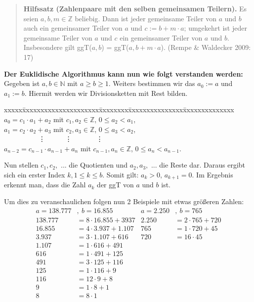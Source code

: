 \documentclass[german,12pt,a4paper]{article}
\begin{document}
\begin{quote}
\small
\textbf{Hilfssatz (Zahlenpaare mit den selben gemeinsamen Teilern).} Es seien $a, b, m \in \mathbb{Z}$ beliebig. Dann ist jeder gemeinsame Teiler von $a$ und $b$ auch ein gemeinsamer Teiler von $a$ und $c := b + m \cdot a$; umgekehrt ist jeder gemeinsame Teiler von $a$ und $c$ ein gemeinsamer Teiler von $a$ und $b$. Insbesondere gilt ggT($a, b$) = ggT($a, b + m \cdot a$).\newline
(Rempe \& Waldecker 2009: 17)\newpage
\end{quote}
\textbf{Der Euklidische Algorithmus kann nun wie folgt verstanden werden:}\newline
Gegeben ist $a, b \in \mathbb{N}$ mit $a \ge b \ge 1$. Weiters bestimmen wir das $a_0 := a$ und $a_1 := b$. Hiermit werden wir Divisionsketten mit Rest bilden.
\begin{tabbing}
xxxxx\=xxxxxxxxxxxxxxxxxxxxx\=xxxxxxxx\=xxxxxxxxxxxxxxx\=xxxxxxxxxxxxxx\kill
\> $a_0 = c_1 \cdot a_1 + a_2$             \> mit \> $c_1, a_2 \in \mathbb{Z}$,     \> $0 \le a_2 < a_1$,  \\
\> $a_1 = c_2 \cdot a_2 + a_3$             \> mit \> $c_2, a_3 \in \mathbb{Z}$,     \> $0 \le a_3 < a_2$,  \\
\> \ \ \ \ \ \ \ \ \ \ \vdots              \>     \>\ \ \ \ \ \vdots                \>\ \ \ \ \ \ \ \vdots \\
\> $a_{n-2} = c_{n-1} \cdot a_{n-1} + a_n$ \> mit \> $c_{n-1}, a_n \in \mathbb{Z}$, \> $0 \le a_n < a_{n-1}$.
\end{tabbing}
Nun stellen $c_1, c_2,$ ... die Quotienten und $a_2, a_3,$ ... die Reste dar. Daraus ergibt sich ein erster Index $k, 1 \le k \le b$. Somit gilt: $a_k > 0$, $a_{k+1} = 0$.\newline
Im Ergebnis erkennt man, dass die Zahl $a_k$ der ggT von $a$ und $b$ ist.

Um dies zu veranschaulichen folgen nun 2 Beispiele mit etwas größeren Zahlen:
\begin{align}
a = 138.777 &,\ b = 16.855        & a = 2.250 &,\ b = 765 \\
138.777 &= 8 \cdot 16.855 + 3937 & 2.250 &= 2 \cdot 765 + 720 \\
16.855  &= 4 \cdot 3.937 + 1.107 & 765   &= 1 \cdot 720 + 45 \\
3.937   &= 3 \cdot 1.107 + 616   & 720   &= 16 \cdot 45 \\
1.107   &= 1 \cdot 616 + 491     &  \\
616     &= 1 \cdot 491 + 125     &  \\
491     &= 3 \cdot 125 + 116     &  \\
125     &= 1 \cdot 116 + 9       &  \\
116     &= 12 \cdot 9 + 8        &  \\
9       &= 1 \cdot 8 + 1         &  \\
8       &= 8 \cdot 1
\end{align}
\end{document}
